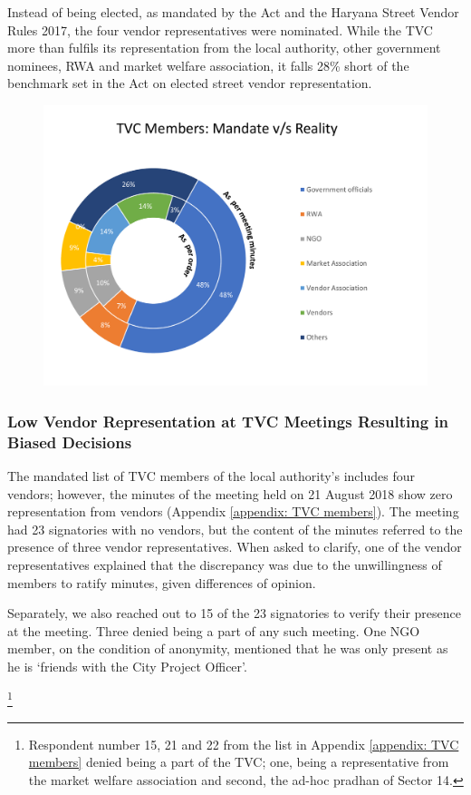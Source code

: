 \documentclass[a4paper, 12pt, twoside]{article}
\begin{document}
{Instead of being elected, as mandated by the Act and the Haryana Street Vendor Rules 2017, the four vendor representatives were nominated. While the TVC more than fulfils its representation from the local authority, other government nominees, RWA and market welfare association, it falls 28\% short of the benchmark set in the Act on elected street vendor representation.

\begin{figure}
\vspace{-40pt}
\centering
\includegraphics[height=0.6\textwidth]{mandatevsreality.pdf}
\end{figure}


\subsubsection*{Low Vendor Representation at TVC Meetings Resulting in Biased Decisions}

The mandated list of TVC members of the local authority’s includes four vendors; however, the minutes of the meeting held on 21 August 2018 show zero representation from vendors (Appendix \ref{appendix: TVC members}). The meeting had 23 signatories with no vendors, but the content of the minutes referred to the presence of three vendor representatives. When asked to clarify, one of the vendor representatives explained that the discrepancy was due to the unwillingness of members to ratify minutes, given differences of opinion.

Separately, we also reached out to 15 of the 23 signatories to verify their presence at the meeting. Three denied being a part of any such meeting. One NGO member, on the condition of anonymity, mentioned that he was only present as he is `friends with the City Project Officer'.{\footnote{Respondent number 15, 21 and 22 from the list in Appendix \ref{appendix: TVC members} denied being a part of the TVC; one, being a representative from the market welfare association and second, the ad-hoc pradhan of Sector 14.}

}}
\end{document}
